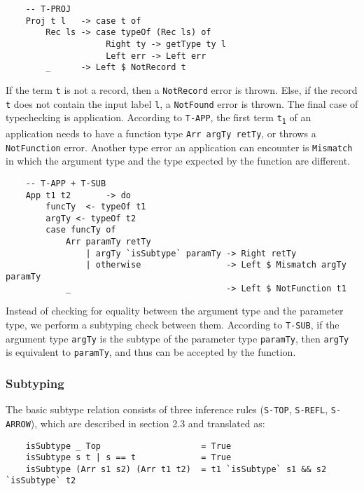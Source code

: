 \documentclass[fleqn, 11pt]{article}
\begin{document}
\begin{Verbatim}
    -- T-PROJ
    Proj t l   -> case t of                                
        Rec ls -> case typeOf (Rec ls) of                       
                    Right ty -> getType ty l
                    Left err -> Left err
        _      -> Left $ NotRecord t 
\end{Verbatim}

If the term \texttt{t} is not a record, then a \texttt{NotRecord} error is thrown. Else, if the record \texttt{t} does not contain the input 
label \texttt{l}, a \texttt{NotFound} error is thrown. The final case of typechecking is application. According to \texttt{T-APP}, the first 
term \texttt{t\textsubscript{1}} of an application needs to have a function type \texttt{Arr argTy retTy}, or throws a \texttt{NotFunction} 
error. Another type error an application can encounter is \texttt{Mismatch} in which the argument type and the type expected by the function 
are different. 

\begin{Verbatim}
    -- T-APP + T-SUB
    App t1 t2       -> do                                            
        funcTy  <- typeOf t1   
        argTy <- typeOf t2                         
        case funcTy of 
            Arr paramTy retTy 
                | argTy `isSubtype` paramTy -> Right retTy
                | otherwise                 -> Left $ Mismatch argTy paramTy
            _                               -> Left $ NotFunction t1
\end{Verbatim}

Instead of checking for equality between the argument type and the parameter type, we perform a subtyping check between them. According to  
\texttt{T-SUB}, if the argument type \texttt{argTy} is the subtype of the parameter type \texttt{paramTy}, then \texttt{argTy} is equivalent to 
\texttt{paramTy}, and thus can be accepted by the function.  

\subsubsection{Subtyping}

The basic subtype relation consists of three inference rules (\texttt{S-TOP}, \texttt{S-REFL}, \texttt{S-ARROW}), which are 
described in section 2.3 and translated as:

\begin{Verbatim}
    isSubtype _ Top                    = True                                      
    isSubtype s t | s == t             = True                                     
    isSubtype (Arr s1 s2) (Arr t1 t2)  = t1 `isSubtype` s1 && s2 `isSubtype` t2 
\end{Verbatim}
\end{document}
